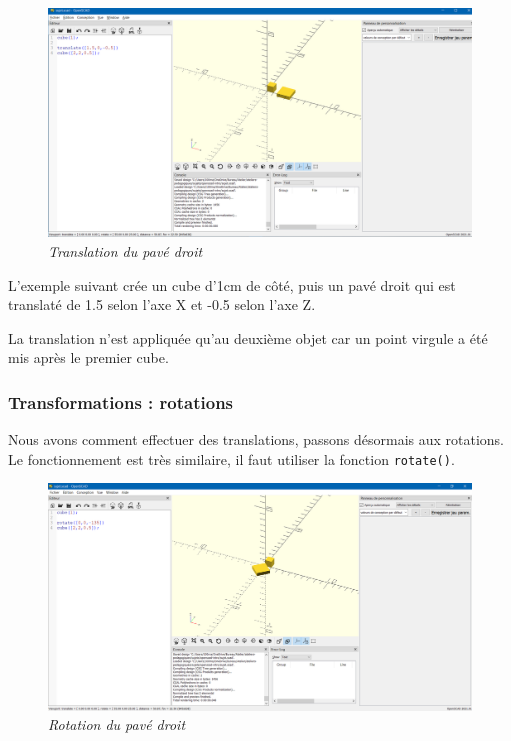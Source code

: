 \begin{figure}[ht]
	\centering
	\includegraphics[width=12cm]{images/translate}
	\caption{\textit{Translation du pavé droit}}
\end{figure}

L'exemple suivant crée un cube d'1cm de côté, puis un pavé droit qui est translaté de 1.5 selon l'axe X et -0.5 selon l'axe Z.

La translation n'est appliquée qu'au deuxième objet car un point virgule a été mis après le premier cube.


\subsubsection{Transformations : rotations}

Nous avons comment effectuer des translations, passons désormais aux rotations.
Le fonctionnement est très similaire, il faut utiliser la fonction \verb|rotate()|.

\vspace{12pt}

\begin{figure}[ht]
	\centering
	\includegraphics[width=12cm]{images/rotate}
	\caption{\textit{Rotation du pavé droit}}
\end{figure}

